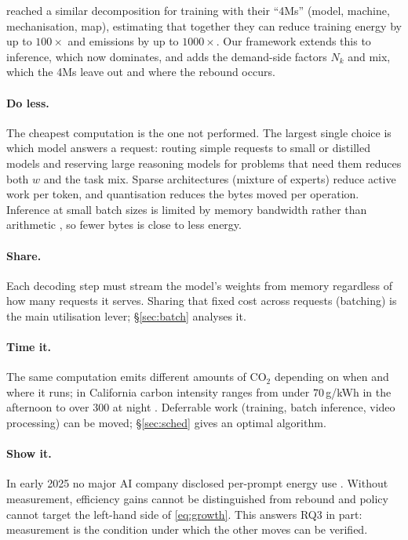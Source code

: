 \documentclass[11pt]{article}
\theoremstyle{definition}
\theoremstyle{remark}
\begin{document}
\citet{patterson2022} reached a similar decomposition for training with their ``4Ms'' (model, machine, mechanisation, map), estimating that together they can reduce training energy by up to $100\times$ and emissions by up to $1000\times$. Our framework extends this to inference, which now dominates, and adds the demand-side factors $N_k$ and mix, which the 4Ms leave out and where the rebound occurs.

\paragraph{Do less.} The cheapest computation is the one not performed. The largest single choice is which model answers a request: routing simple requests to small or distilled models and reserving large reasoning models for problems that need them reduces both $w$ and the task mix. Sparse architectures (mixture of experts) reduce active work per token, and quantisation reduces the bytes moved per operation. Inference at small batch sizes is limited by memory bandwidth rather than arithmetic \citep{leviathan2023}, so fewer bytes is close to less energy.

\paragraph{Share.} Each decoding step must stream the model's weights from memory regardless of how many requests it serves. Sharing that fixed cost across requests (batching) is the main utilisation lever; \S\ref{sec:batch} analyses it.

\paragraph{Time it.} The same computation emits different amounts of CO$_2$ depending on when and where it runs; in California carbon intensity ranges from under $70$\,g/kWh in the afternoon to over $300$ at night \citep{mittr2025}. Deferrable work (training, batch inference, video processing) can be moved; \S\ref{sec:sched} gives an optimal algorithm.

\paragraph{Show it.} In early 2025 no major AI company disclosed per-prompt energy use \citep{mittr2025}. Without measurement, efficiency gains cannot be distinguished from rebound and policy cannot target the left-hand side of \eqref{eq:growth}. This answers RQ3 in part: measurement is the condition under which the other moves can be verified.
\end{document}
